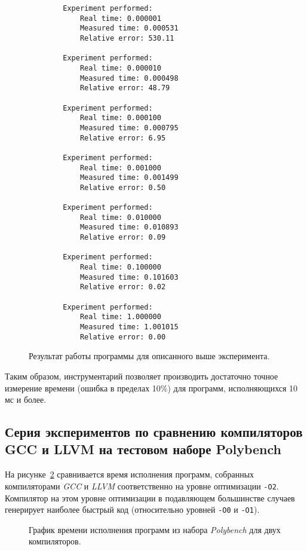 \begin{figure}[H]
    \fontsize{10}{12}
    \begin{verbatim}
        Experiment performed:
            Real time: 0.000001
            Measured time: 0.000531
            Relative error: 530.11
        
        Experiment performed:
            Real time: 0.000010
            Measured time: 0.000498
            Relative error: 48.79
        
        Experiment performed:
            Real time: 0.000100
            Measured time: 0.000795
            Relative error: 6.95
        
        Experiment performed:
            Real time: 0.001000
            Measured time: 0.001499
            Relative error: 0.50
        
        Experiment performed:
            Real time: 0.010000
            Measured time: 0.010893
            Relative error: 0.09
        
        Experiment performed:
            Real time: 0.100000
            Measured time: 0.101603
            Relative error: 0.02
        
        Experiment performed:
            Real time: 1.000000
            Measured time: 1.001015
            Relative error: 0.00
    \end{verbatim}
    \caption{Результат работы программы для описанного выше эксперимента.}
    \label{img:default_calibration}
\end{figure}

Таким образом, инструментарий позволяет производить достаточно точное измерение времени (ошибка в пределах 10\%) для программ, исполняющихся 10 мс и более.


\subsection{Серия экспериментов по сравнению компиляторов GCC и LLVM на тестовом наборе Polybench}
\label{series-llvm-vs-gcc}
На рисунке~\ref{img:gcc-vs-clang} сравнивается время исполнения программ, собранных компиляторами \textit{GCC} и \textit{LLVM} соответственно на уровне оптимизации \texttt{-O2}. Компилятор на этом уровне оптимизации в подавляющем большинстве случаев генерирует наиболее быстрый код (относительно уровней \texttt{-O0} и \texttt{-O1}).

\begin{figure}[!bH]
    \caption{График времени исполнения программ из набора \textit{Polybench} для двух компиляторов.}
    \label{img:gcc-vs-clang}
\end{figure}


